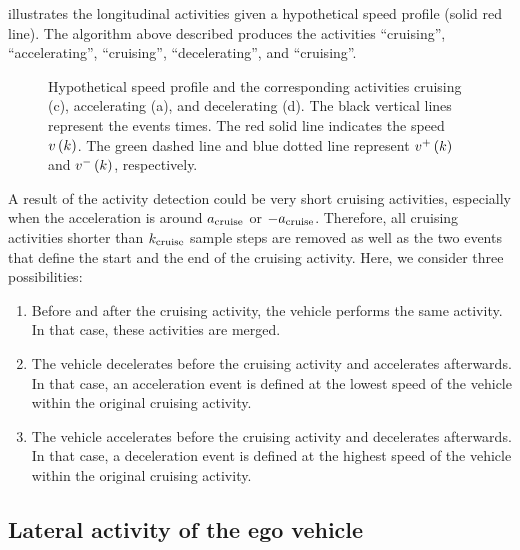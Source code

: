 \cstarta%
 illustrates the longitudinal activities given a hypothetical speed profile (solid red line). The algorithm above described produces the activities ``cruising'', ``accelerating'', ``cruising'', ``decelerating'', and ``cruising''.
\cenda

\setlength{\figurewidth}{\linewidth}
\setlength{\figureheight}{0.7\linewidth}
\begin{figure}
	\centering
	
	\caption{\cstarta Hypothetical speed profile and the corresponding activities cruising (c), accelerating (a), and decelerating (d). The black vertical lines represent the events times. The red solid line indicates the speed $v\left(k\right)$. The green dashed line and blue dotted line represent $v^{+}\left(k\right)$ and $v^{-}\left(k\right)$, respectively.\cenda}
	\label{fig:longitudinal activities}
\end{figure}

A result of the activity detection could be very short cruising activities, especially when the acceleration is around $a_\mathrm{cruise}$ or $-a_\mathrm{cruise}$. 
Therefore, all cruising activities shorter than $k_\mathrm{cruise}$ sample steps are removed as well as the two events that define the start and the end of the cruising activity. 
Here, we consider three possibilities:
\begin{enumerate}
	\item Before and after the cruising activity, the vehicle performs the same activity. In that case, these activities are merged.
	\item The vehicle decelerates before the cruising activity and accelerates afterwards. In that case, an acceleration event is defined at the lowest speed of the vehicle within the original cruising activity.
	\item The vehicle accelerates before the cruising activity and decelerates afterwards. In that case, a deceleration event is defined at the highest speed of the vehicle within the original cruising activity.
\end{enumerate}



\subsection{Lateral activity of the ego vehicle}
\label{sec:lateral ego}

